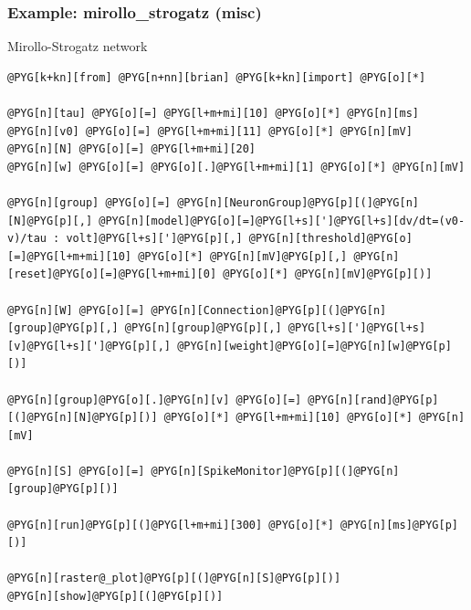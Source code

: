 \documentclass[letterpaper,10pt,english]{manual}
\begin{document}
\resetcurrentobjects
\hypertarget{--doc-examples-misc_mirollo_strogatz}{}

\hypertarget{index-54}{}\subsubsection{Example: mirollo\_strogatz (misc)}

Mirollo-Strogatz network

\begin{Verbatim}[commandchars=@\[\]]
@PYG[k+kn][from] @PYG[n+nn][brian] @PYG[k+kn][import] @PYG[o][*]

@PYG[n][tau] @PYG[o][=] @PYG[l+m+mi][10] @PYG[o][*] @PYG[n][ms]
@PYG[n][v0] @PYG[o][=] @PYG[l+m+mi][11] @PYG[o][*] @PYG[n][mV]
@PYG[n][N] @PYG[o][=] @PYG[l+m+mi][20]
@PYG[n][w] @PYG[o][=] @PYG[o][.]@PYG[l+m+mi][1] @PYG[o][*] @PYG[n][mV]

@PYG[n][group] @PYG[o][=] @PYG[n][NeuronGroup]@PYG[p][(]@PYG[n][N]@PYG[p][,] @PYG[n][model]@PYG[o][=]@PYG[l+s][']@PYG[l+s][dv/dt=(v0-v)/tau : volt]@PYG[l+s][']@PYG[p][,] @PYG[n][threshold]@PYG[o][=]@PYG[l+m+mi][10] @PYG[o][*] @PYG[n][mV]@PYG[p][,] @PYG[n][reset]@PYG[o][=]@PYG[l+m+mi][0] @PYG[o][*] @PYG[n][mV]@PYG[p][)]

@PYG[n][W] @PYG[o][=] @PYG[n][Connection]@PYG[p][(]@PYG[n][group]@PYG[p][,] @PYG[n][group]@PYG[p][,] @PYG[l+s][']@PYG[l+s][v]@PYG[l+s][']@PYG[p][,] @PYG[n][weight]@PYG[o][=]@PYG[n][w]@PYG[p][)]

@PYG[n][group]@PYG[o][.]@PYG[n][v] @PYG[o][=] @PYG[n][rand]@PYG[p][(]@PYG[n][N]@PYG[p][)] @PYG[o][*] @PYG[l+m+mi][10] @PYG[o][*] @PYG[n][mV]

@PYG[n][S] @PYG[o][=] @PYG[n][SpikeMonitor]@PYG[p][(]@PYG[n][group]@PYG[p][)]

@PYG[n][run]@PYG[p][(]@PYG[l+m+mi][300] @PYG[o][*] @PYG[n][ms]@PYG[p][)]

@PYG[n][raster@_plot]@PYG[p][(]@PYG[n][S]@PYG[p][)]
@PYG[n][show]@PYG[p][(]@PYG[p][)]
\end{Verbatim}

\resetcurrentobjects
\hypertarget{--doc-examples-misc_multipleclocks}{}
\end{document}
